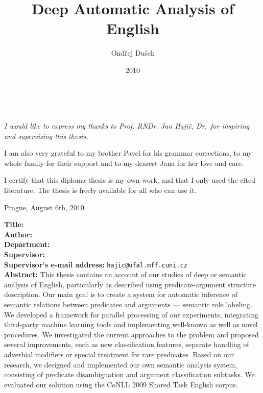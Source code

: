 \documentclass[12pt,notitlepage,a4paper]{report}
\title{Deep Automatic Analysis of English}
\author{Ondřej Dušek}
\date{2010}
\def\fulldate{August 6th, 2010}
\begin{document}
\maketitle

\pagestyle{plain}
\normalsize %
\setcounter{page}{2} %
\cleardoublepage
\ \vspace{10mm}

\noindent \it I would like to express my thanks to Prof. RNDr. Jan Hajič, Dr.\ for inspiring and supervising this thesis.

I am also very grateful to my brother Pavel for his grammar corrections, to my whole family for their support and to my dearest Jana for her love and care.

\vspace{\fill}
\noindent \rm I certify that this diploma thesis is my own work, and that I only used the cited literature. The thesis is freely available for all who can use it.

\bigskip
\noindent Prague, \fulldate \hspace{\fill}\theauthor\\ %


\cleardoublepage
\tableofcontents %

\cleardoublepage %
\pagestyle{plain}
\noindent
\textbf{Title:} \thetitle\\
\textbf{Author:} \theauthor\\
\textbf{Department:} \thedept\\
\textbf{Supervisor:} \thesupervisor\\
\textbf{Supervisor's e-mail address:} \texttt{hajic@ufal.mff.cuni.cz}\\

\noindent \textbf{Abstract:} This thesis contains an account of our studies of deep or semantic analysis of English, particularly as described using predicate-argument structure description. Our main goal is to create a system for automatic inference of semantic relations between predicates and arguments --- semantic role labeling. We developed a framework for parallel processing of our experiments, integrating third-party machine learning tools and implementing well-known as well as novel procedures. We investigated the current approaches to the problem and proposed several improvements, such as new classification features, separate handling of adverbial modifiers or special treatment for rare predicates. Based on our research, we designed and implemented our own semantic analysis system, consisting of predicate disambiguation and argument classification subtasks. We evaluated our solution using the CoNLL 2009 Shared Task English corpus. \\
\end{document}
